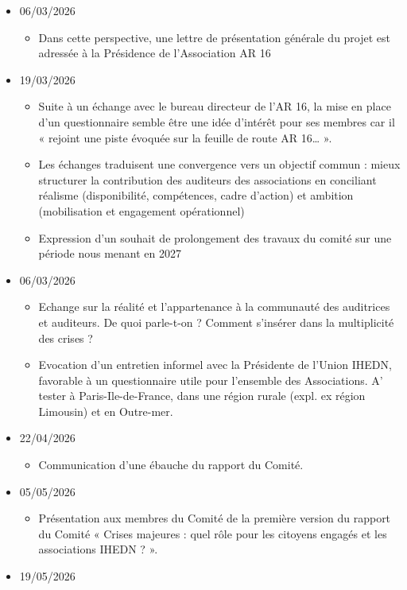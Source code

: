 \documentclass[10pt,a4paper]{article}
\begin{document}
\begin{itemize}
\begin{itemize}
\end{itemize}
\item 06/03/2026
\begin{itemize}
\item Dans cette perspective, une lettre de présentation générale du projet est adressée à la Présidence de l'Association AR 16 
\end{itemize}
\item 19/03/2026
\begin{itemize}
\item Suite à un échange avec le bureau directeur de l'AR 16, la mise en place d'un questionnaire semble être une idée d'intérêt pour ses membres car il « rejoint une piste évoquée sur la feuille de route AR 16… ».
\item Les échanges traduisent une convergence vers un objectif commun : mieux structurer la contribution des auditeurs des associations en conciliant réalisme (disponibilité, compétences, cadre d'action) et ambition (mobilisation et engagement opérationnel)
\item Expression d'un souhait de prolongement des travaux du comité sur une période nous menant en 2027
\end{itemize}
\item 06/03/2026
\begin{itemize}
\item Echange sur la réalité et l'appartenance à la communauté des auditrices et auditeurs. De quoi parle-t-on ? Comment s'insérer dans la multiplicité des crises ?
\item Evocation d'un entretien informel avec la Présidente de l'Union IHEDN, favorable à un questionnaire utile pour l'ensemble des Associations. A' tester à Paris-Ile-de-France, dans une région rurale (expl. ex région Limousin) et en Outre-mer.
\end{itemize}
\item 22/04/2026
\begin{itemize}
\item Communication d'une ébauche du rapport du Comité.
\end{itemize}
\item 05/05/2026
\begin{itemize}
\item Présentation aux membres du Comité de la première version du rapport du Comité « Crises majeures : quel rôle pour les citoyens engagés et les associations IHEDN ? ».
\end{itemize}
\item 19/05/2026

\end{itemize}
\end{document}
